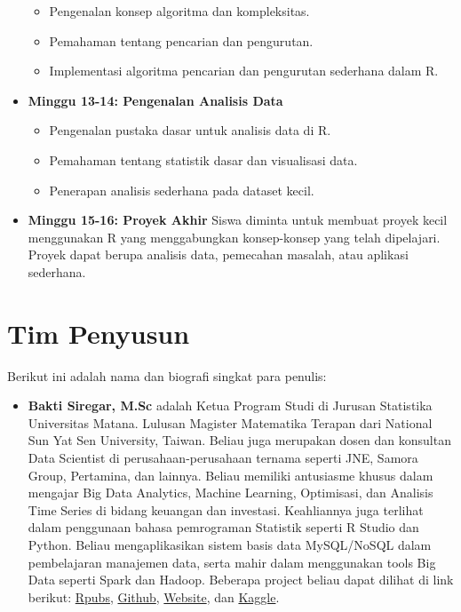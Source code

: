 \documentclass[
]{book}
\providecommand{\tightlist}{%
  \setlength{\itemsep}{0pt}\setlength{\parskip}{0pt}}
\theoremstyle{definition}
\theoremstyle{definition}
\theoremstyle{definition}
\theoremstyle{definition}
\theoremstyle{remark}
\begin{document}
\begin{itemize}
  \begin{itemize}
  \tightlist
  \item
    Pengenalan konsep algoritma dan kompleksitas.
  \item
    Pemahaman tentang pencarian dan pengurutan.
  \item
    Implementasi algoritma pencarian dan pengurutan sederhana dalam R.
  \end{itemize}
\item
  \textbf{Minggu 13-14: Pengenalan Analisis Data}

  \begin{itemize}
  \tightlist
  \item
    Pengenalan pustaka dasar untuk analisis data di R.
  \item
    Pemahaman tentang statistik dasar dan visualisasi data.
  \item
    Penerapan analisis sederhana pada dataset kecil.
  \end{itemize}
\item
  \textbf{Minggu 15-16: Proyek Akhir}
  Siswa diminta untuk membuat proyek kecil menggunakan R yang menggabungkan konsep-konsep yang telah dipelajari. Proyek dapat berupa analisis data, pemecahan masalah, atau aplikasi sederhana.
\end{itemize}

\hypertarget{tim-penyusun}{%
\section*{Tim Penyusun}\label{tim-penyusun}}

Berikut ini adalah nama dan biografi singkat para penulis:

\begin{itemize}
\tightlist
\item
  \textbf{Bakti Siregar, M.Sc} adalah Ketua Program Studi di Jurusan Statistika Universitas Matana. Lulusan Magister Matematika Terapan dari National Sun Yat Sen University, Taiwan. Beliau juga merupakan dosen dan konsultan Data Scientist di perusahaan-perusahaan ternama seperti JNE, Samora Group, Pertamina, dan lainnya. Beliau memiliki antusiasme khusus dalam mengajar Big Data Analytics, Machine Learning, Optimisasi, dan Analisis Time Series di bidang keuangan dan investasi. Keahliannya juga terlihat dalam penggunaan bahasa pemrograman Statistik seperti R Studio dan Python. Beliau mengaplikasikan sistem basis data MySQL/NoSQL dalam pembelajaran manajemen data, serta mahir dalam menggunakan tools Big Data seperti Spark dan Hadoop. Beberapa project beliau dapat dilihat di link berikut: \href{https://rpubs.com/dsciencelabs}{Rpubs}, \href{https://github.com/dsciencelabs}{Github}, \href{https://dsciencelabs.github.io/web/index.html}{Website}, dan \href{https://www.kaggle.com/baktisiregar/code}{Kaggle}.
\end{itemize}
\end{document}
